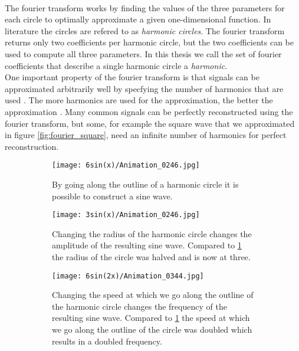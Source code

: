\documentclass[thesis.tex]{subfiles}
\begin{document}
\\
The fourier transform works by finding the values of the three parameters for each circle to optimally approximate a given one-dimensional function. In literature the circles are refered to as \textit{harmonic circles}. The fourier transform returns only two coefficients per harmonic circle, but the two coefficients can be used to compute all three parameters. In this thesis we call the set of fourier coefficients that describe a single harmonic circle a \textit{harmonic}. 
 \\ One important property of the fourier transform is that signals can be approximated arbitrarily well by specfying the number of harmonics that are used \cite{nixon2012feature}. The more harmonics are used for the approximation, the better the approximation \cite{nixon2012feature}. Many common signals can be perfectly reconstructed using the fourier transform, but some, for example the square wave that we approximated in figure \ref{fig:fourier_square}, need an infinite number of harmonics for perfect reconstruction.\\ 

\begin{figure}
\centering
	\begin{subfigure}[t]{\textwidth}
		\centering
		\texttt{[image: 6sin(x)/Animation\_0246.jpg]}
		\caption{By going along the outline of a harmonic circle it is possible to construct a sine wave.}\label{fig:fourier}		
	\end{subfigure}
	\begin{subfigure}[t]{\textwidth}
		\centering
		\texttt{[image: 3sin(x)/Animation\_0246.jpg]}
		\caption{Changing the radius of the harmonic circle changes the amplitude of the resulting sine wave. Compared to \ref{fig:fourier} the radius of the circle was halved and is now at three.}\label{fig:fourier_radius}		
	\end{subfigure}
	\begin{subfigure}[t]{\textwidth}
		\centering
		\texttt{[image: 6sin(2x)/Animation\_0344.jpg]}
		\caption{Changing the speed at which we go along the outline of the harmonic circle changes the frequency of the resulting sine wave. Compared to \ref{fig:fourier} the speed at which we go along the outline of the circle was doubled which results in a doubled frequency.}\label{fig:fourier_speed}		
	\end{subfigure}
	\caption{}
\end{figure}
 \smallskip
\end{document}
